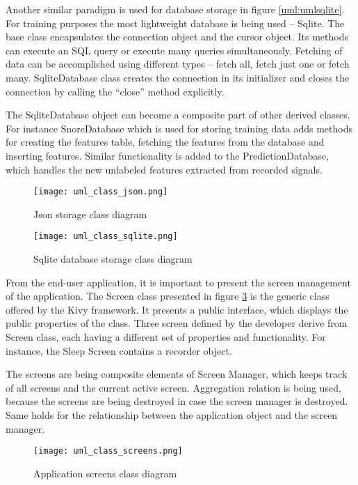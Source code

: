 Another similar paradigm is used for database storage in figure \ref{uml:umlsqlite}. For training purposes the most lightweight database is being used -- Sqlite. The base class encapsulates the connection object and the cursor object. Its methods can execute an SQL query or execute many queries simultaneously. Fetching of data can be accomplished using different types -- fetch all, fetch just one or fetch many. SqliteDatabase class creates the connection in its initializer and closes the connection by calling the ``close'' method explicitly.

The SqliteDatabase object can become a composite part of other derived classes. For instance SnoreDatabase which is used for storing training data adds methods for creating the features table, fetching the features from the database and inserting features. Similar functionality is added to the PredictionDatabase, which handles the new unlabeled features extracted from recorded signals.

\begin{figure}[!ht]
\centering
  \texttt{[image: uml\_class\_json.png]}
\caption{Json storage class diagram}
\label{fig:umljson}
\end{figure}

\vspace{5mm}

\begin{figure}[!ht]
\centering
  \texttt{[image: uml\_class\_sqlite.png]}
\caption{Sqlite database storage class diagram}
\label{fig:umlsqlite}
\end{figure}

From the end-user application, it is important to present the screen management of the application. The Screen class presented in figure \ref{fig:umlscreens} is the generic class offered by the Kivy framework. It presents a public interface, which displays the public properties of the class. Three screen defined by the developer derive from Screen class, each having a different set of properties and functionality. For instance, the Sleep Screen contains a recorder object. 

The screens are being composite elements of Screen Manager, which keeps track of all screens and the current active screen. Aggregation relation is being used, because the screens are being destroyed in case the screen manager is destroyed. Same holds for the relationship between the application object and the screen manager.

\begin{figure}[!ht]
\centering
  \texttt{[image: uml\_class\_screens.png]}
\caption{Application screens class diagram}
\label{fig:umlscreens}
\end{figure}

